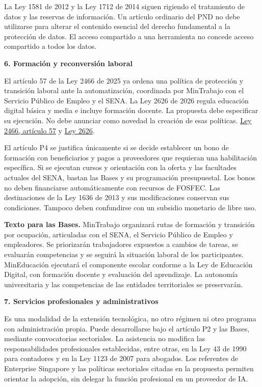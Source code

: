 La Ley 1581 de 2012 y la Ley 1712 de 2014 siguen rigiendo el tratamiento de datos y las reservas de información. Un artículo ordinario del PND no debe utilizarse para alterar el contenido esencial del derecho fundamental a la protección de datos. El acceso compartido a una herramienta no concede acceso compartido a todos los datos.

\textbf{6. Formación y reconversión laboral}\par\nobreak

El artículo 57 de la Ley 2466 de 2025 ya ordena una política de protección y transición laboral ante la automatización, coordinada por MinTrabajo con el Servicio Público de Empleo y el SENA. La Ley 2626 de 2026 regula educación digital básica y media e incluye formación docente. La propuesta debe especificar su ejecución. No debe anunciar como novedad la creación de esas políticas. \href{https://normativa.colpensiones.gov.co/compilacion/docs/ley\_2466\_2025.htm}{Ley 2466, artículo 57} y \href{https://normativa.colpensiones.gov.co/compilacion/docs/ley\_2626\_2026.htm}{Ley 2626}.

El artículo P4 se justifica únicamente si se decide establecer un bono de formación con beneficiarios y pagos a proveedores que requieran una habilitación específica. Si se ejecutan cursos y orientación con la oferta y las facultades actuales del SENA, bastan las Bases y su programación presupuestal. Los bonos no deben financiarse automáticamente con recursos de FOSFEC. Las destinaciones de la Ley 1636 de 2013 y sus modificaciones conservan sus condiciones. Tampoco deben confundirse con un subsidio monetario de libre uso.

\textbf{Texto para las Bases.} MinTrabajo organizará rutas de formación y transición por ocupación, articuladas con el SENA, el Servicio Público de Empleo y empleadores. Se priorizarán trabajadores expuestos a cambios de tareas, se evaluarán competencias y se seguirá la situación laboral de los participantes. MinEducación ejecutará el componente escolar conforme a la Ley de Educación Digital, con formación docente y evaluación del aprendizaje. La autonomía universitaria y las competencias de las entidades territoriales se preservarán.

\textbf{7. Servicios profesionales y administrativos}\par\nobreak

Es una modalidad de la extensión tecnológica, no otro régimen ni otro programa con administración propia. Puede desarrollarse bajo el artículo P2 y las Bases, mediante convocatorias sectoriales. La asistencia no modifica las responsabilidades profesionales establecidas, entre otras, en la Ley 43 de 1990 para contadores y en la Ley 1123 de 2007 para abogados. Los referentes de Enterprise Singapore y las políticas sectoriales citadas en la propuesta permiten orientar la adopción, sin delegar la función profesional en un proveedor de IA.

